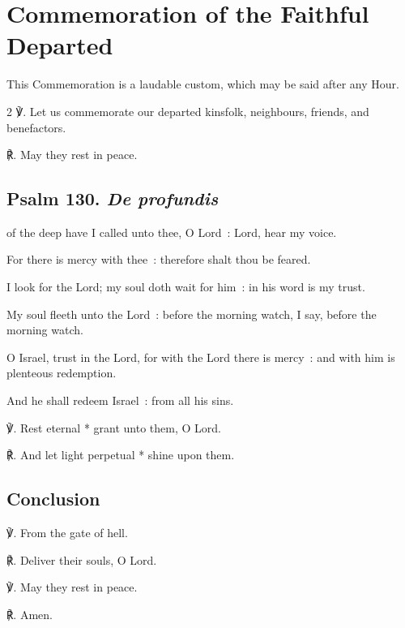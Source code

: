 \section{Commemoration of the Faithful Departed}
\fancyhead[RE,LO]{}
\begin{secrubric}
    This Commemoration is a laudable custom, which may be said after any Hour.
\end{secrubric}
\begin{multicols}{2}
℣. Let us commemorate our departed kinsfolk, neighbours, friends, and benefactors.

℟. May they rest in peace.

\subsection{Psalm 130. \textit{De profundis}}

 of the deep have I called unto thee, O Lord~: Lord, hear my voice.\par
{}
For there is mercy with thee~: therefore shalt thou be feared.\par
{}I look for the Lord; my soul doth wait for him~: in his word is my trust.\par
{}My soul fleeth unto the Lord~: before the morning watch, I say, before the morning watch.\par
{}O Israel, trust in the Lord, for with the Lord there is mercy~: and with him is plenteous redemption.\par
{}And he shall redeem Israel~: from all his sins.\par
℣. Rest eternal * grant unto them, O Lord.\par
℟. And let light perpetual * shine upon them.%

\subsection{Conclusion}

℣. From the gate of hell.\par
℟. Deliver their souls, O Lord.

℣. May they rest in peace.\par
℟. Amen.\\


\end{multicols}
